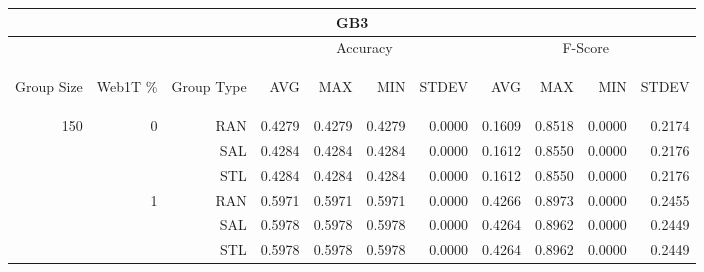 \begin{center}
\begin{table}[htbp]
\begin{tabular}{ | r | r | r | r | r | r | r | r | r | r | r |}
\hline
\multicolumn{11}{|c|}{GB3}\\
\hline
 & & & \multicolumn{4}{|c|}{Accuracy} & \multicolumn{4}{|c|}{F-Score}\\ \cline{4-11}
\begin{sideways}Group Size\end{sideways} & \begin{sideways}Web1T \%\end{sideways} & \begin{sideways}Group Type\end{sideways} & \begin{sideways}AVG\end{sideways} & \begin{sideways}MAX\end{sideways} & \begin{sideways}MIN\end{sideways} & \begin{sideways}STDEV\end{sideways} & \begin{sideways}AVG\end{sideways} & \begin{sideways}MAX\end{sideways} & \begin{sideways}MIN\end{sideways} & \begin{sideways}STDEV\end{sideways}\\
\hline
\multirow{18}{*}{150}
 & \multirow{3}{*}{0} & RAN & 0.4279 & 0.4279 & 0.4279 & 0.0000 & 0.1609 & 0.8518 & 0.0000 & 0.2174\\ \cline{3-11}
 &   & SAL & 0.4284 & 0.4284 & 0.4284 & 0.0000 & 0.1612 & 0.8550 & 0.0000 & 0.2176\\ \cline{3-11}
 &   & STL & 0.4284 & 0.4284 & 0.4284 & 0.0000 & 0.1612 & 0.8550 & 0.0000 & 0.2176\\ \cline{2-11}
 & \multirow{3}{*}{1} & RAN & 0.5971 & 0.5971 & 0.5971 & 0.0000 & 0.4266 & 0.8973 & 0.0000 & 0.2455\\ \cline{3-11}
 &   & SAL & 0.5978 & 0.5978 & 0.5978 & 0.0000 & 0.4264 & 0.8962 & 0.0000 & 0.2449\\ \cline{3-11}
 &   & STL & 0.5978 & 0.5978 & 0.5978 & 0.0000 & 0.4264 & 0.8962 & 0.0000 & 0.2449\\ \cline{2-11}

\end{tabular}
\end{table}
\end{center}
